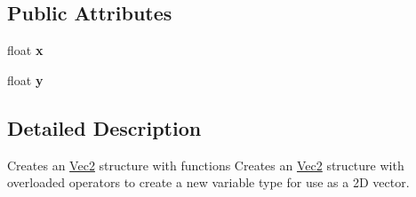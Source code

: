 \subsection*{Public Attributes}
\begin{DoxyCompactItemize}
\item 
\hypertarget{struct_vec2_adf8ee322d4b4bcc04146762c018d731f}{float {\bfseries x}}\label{struct_vec2_adf8ee322d4b4bcc04146762c018d731f}

\item 
\hypertarget{struct_vec2_a30543787e62f6d915543cf1dfb04c094}{float {\bfseries y}}\label{struct_vec2_a30543787e62f6d915543cf1dfb04c094}

\end{DoxyCompactItemize}


\subsection{Detailed Description}
Creates an \hyperlink{struct_vec2}{Vec2} structure with functions Creates an \hyperlink{struct_vec2}{Vec2} structure with overloaded operators to create a new variable type for use as a 2\+D vector. 

